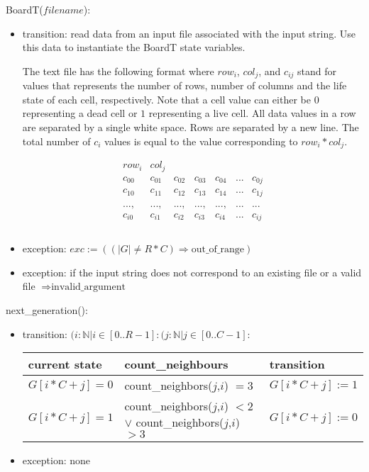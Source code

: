\documentclass[12pt]{article}
\begin{document}
\noindent BoardT($\mathit{filename}$):
\begin{itemize}
\item transition: read data from an input file associated with the input string. Use this data to instantiate the BoardT state variables.

The text file has the following format where $row_i$, $col_j$, and $c_{ij}$ stand for values that represents the number of rows, number of columns and the life state of each cell, respectively. Note that a cell value can either be $0$ representing a dead cell or $1$ representing a live cell. All data values in a row are separated by a single white space. Rows are separated by a new line. The total number of $c_i$ values is equal to the value corresponding to $row_i * col_j$.

  \begin{equation}
    \begin{array}{ccccccc}
      row_i & col_j &  &  &  & &  \\
      c_{00} & c_{01} & c_{02} & c_{03} & c_{04} & ... & c_{0j}\\
      c_{10} & c_{11} & c_{12} & c_{13} & c_{14} & ... & c_{1j}\\
      \\
      ..., & ..., & ..., & ..., & ..., & ... & ...
      \\
      c_{i0} & c_{i1} & c_{i2} & c_{i3} & c_{i4} & ... & c_{ij}\\ \\
    \end{array}
  \end{equation}

\item exception: $exc := ((|G| \ne R * C) \Rightarrow \text{out\_of\_range})$
\item exception: if the input string does not correspond to an existing file or a valid file $\Rightarrow \text{invalid\_argument}$
\end{itemize}

\newpage

\noindent next\_generation():
\begin{itemize}
\item transition: $(i : \mathbb{N}| i \in [0..R-1] : (j : \mathbb{N} |j \in [0..C-1] :$

\begin{tabular}{| l | l | l |}
\hline
\textbf{current state} & \textbf{count\_neighbours} & \textbf{transition}\\
\hline
$G[i*C + j] = 0$ & count\_neighbors($j$,$i$) $= 3$ & $G[i*C + j] := 1$ \\
\hline
$G[i*C + j] = 1$ & count\_neighbors($j$,$i$) $< 2$ $\lor$ count\_neighbors($j$,$i$)  $> 3$ & $G[i*C + j] := 0$ \\
\hline
\end{tabular}

\item exception: none

\end{itemize}
\end{document}
